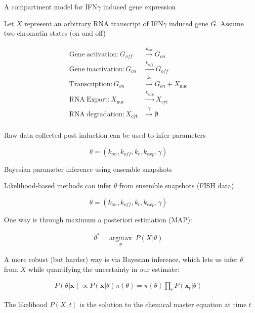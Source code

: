 \documentclass[aspectratio=1610]{beamer}					%
\begin{document}
\begin{frame}{A compartment model for IFN$\gamma$ induced gene expression}

Let $X$ represent an arbitrary RNA transcript of IFN$\gamma$ induced gene $G$. Assume two chromatin states (on and off)

\begin{align*}
\mathrm{Gene\;activation}: G_{off} &\overset{k_{on}}{\rightarrow} G_{on}\\
\mathrm{Gene\;inactivation}: G_{on} &\overset{k_{off}}{\rightarrow} G_{off}\\
\mathrm{Transcription}: G_{on} &\overset{k_{t}}{\rightarrow} G_{on} + X_{\mathrm{nuc}}\\
\mathrm{RNA \;Export}: X_{\mathrm{nuc}} &\overset{k_{exp}}{\rightarrow} X_{\mathrm{cyt}}\\
\mathrm{RNA\; degradation}: X_{\mathrm{cyt}} &\overset{\gamma}{\rightarrow} \emptyset\\
\end{align*}

Raw data collected post induction can be used to infer parameters

\begin{equation*}
\theta = \left( k_{on},k_{off},k_{t},k_{exp},\gamma\right)
\end{equation*}

\end{frame}

\begin{frame}{Bayesian parameter inference using ensemble snapshots}
\vspace{0.1in}

Likelihood-based methods can infer $\theta$ from ensemble snapshots (FISH data)

\begin{equation*}
\theta = \left( k_{on},k_{off},k_{t},k_{exp},\gamma\right)
\end{equation*}

One way is through maximum a posteriori estimation (MAP):

\begin{align*}
\theta^{*} = \underset{\theta}{\mathrm{argmax}} \;\;P(X|\theta)
\end{align*}

A more robust (but harder) way is via Bayesian inference, which lets us infer $\theta$ from $X$ while quantifying the uncertainty in our estimate:

\begin{align*}
P(\theta|\mathbf{x}) \propto P(\mathbf{x}|\theta)\pi(\theta) = \pi(\theta)\prod_{t} P(\mathbf{x}_{t}|\theta)
\end{align*}

The likelihood $P(X,t)$ is the solution to the chemical master equation at time $t$

\end{frame}
\end{document}
